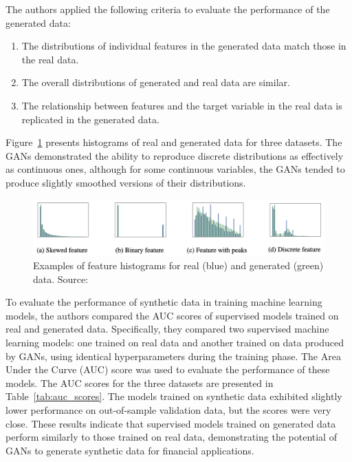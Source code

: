 \documentclass[12pt]{article}
\begin{document}
The authors applied the following criteria to evaluate the performance of the generated data:
\begin{enumerate}
    \item The distributions of individual features in the generated data match those in the real data.
    \item The overall distributions of generated and real data are similar.
    \item The relationship between features and the target variable in the real data is replicated in the generated data.
\end{enumerate}

Figure~\ref{fig:ganfinance} presents histograms of real and generated data for three datasets. The GANs demonstrated the ability to reproduce discrete distributions as effectively as continuous ones, although for some continuous variables, the GANs tended to produce slightly smoothed versions of their distributions.

\begin{figure}[!htbp]
    \centering
    \includegraphics[width=\textwidth]{../Figures/Figure4.png}
    \caption{Examples of feature histograms for real (blue) and generated (green) data. Source: \cite{efimovUsingGenerativeAdversarial2020}}
    \label{fig:ganfinance}
\end{figure}

To evaluate the performance of synthetic data in training machine learning models, the authors compared the AUC scores of supervised models trained on real and generated data. Specifically, they compared two supervised machine learning models: one trained on real data and another trained on data produced by GANs, using identical hyperparameters during the training phase. The Area Under the Curve (AUC) score was used to evaluate the performance of these models. The AUC scores for the three datasets are presented in Table~\ref{tab:auc_scores}. The models trained on synthetic data exhibited slightly lower performance on out-of-sample validation data, but the scores were very close. These results indicate that supervised models trained on generated data perform similarly to those trained on real data, demonstrating the potential of GANs to generate synthetic data for financial applications.
\end{document}
